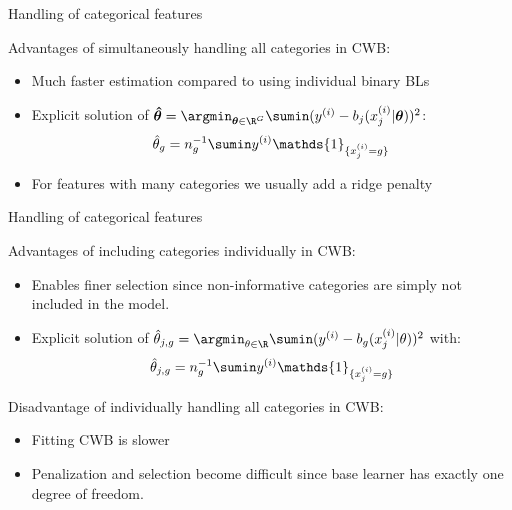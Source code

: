 \documentclass[11pt,compress,t,notes=noshow, xcolor=table]{beamer}
\begin{document}
\begin{frame2}{Handling of categorical features}

Advantages of simultaneously handling all categories in CWB: 
\begin{itemize}
    \item 
        Much faster estimation compared to using individual binary BLs

    \item 
        Explicit solution of $\thetavh = \argmin_{\thetav\in\R^G}\sumin (\yi - b_j(x^{(i)}_j | \thetav))^2$:
        $$
        \thetah_g = n_g^{-1}\sumin \yi \mathds{1}_{\{x^{(i)}_j = g\}}
        $$

    \item 
        For features with many categories we usually add a ridge penalty
\end{itemize}


\end{frame2}
\begin{frame2}{Handling of categorical features}

Advantages of including categories individually in CWB: 
\begin{itemize}
    \item 
        Enables finer selection since non-informative categories are simply not included in the model. %

    \item 
        Explicit solution of $\thetah_{j,g} = \argmin_{\theta\in\R}\sumin (\yi - b_g(x^{(i)}_j|\theta))^2$ with:
        $$\thetah_{j,g} = n_g^{-1}\sumin \yi \mathds{1}_{\{x^{(i)}_j = g\}}$$
\end{itemize}

Disadvantage of individually handling all categories in CWB:
\begin{itemize}
    \item 
        Fitting CWB is slower 

    \item 
        Penalization and selection become difficult since base learner has exactly one degree of freedom.
\end{itemize}

\end{frame2}
\end{document}
